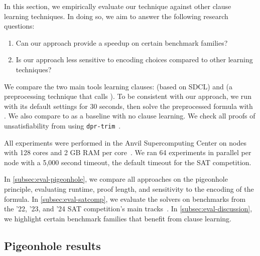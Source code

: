 In this section, we empirically evaluate our technique against other \pr clause
learning techniques. In doing so, we aim to answer the following research
questions:


\begin{enumerate}[label={RQ\arabic*}]
    \item Can our approach provide a speedup on certain benchmark families?
    \item Is our approach less sensitive to encoding choices compared to other
    \pr learning techniques?
\end{enumerate}


We compare the two main tools learning \pr clauses: \sadical (based on SDCL) and
\prelearn (a preprocessing technique that calls \sadical). To be consistent with
our approach, we run \prelearn with its default settings for 30 seconds, then
solve the preprocessed formula with \cadical. We also compare to \cadical as a
baseline with no \pr clause learning. We check all proofs of unsatisfiability
from \tool using \texttt{dpr-trim}~\cite{dpr-trim}.

All experiments were performed in the Anvil Supercomputing Center on nodes with
128 cores and 2 GB RAM per core~\cite{anvil}. We ran 64 experiments in parallel
per node with a 5,000 second timeout, the default timeout for the SAT
competition.

In \autoref{subsec:eval-pigeonhole}, we compare all approaches on the pigeonhole
principle, evaluating runtime, proof length, and sensitivity to the encoding of
the formula. In \autoref{subsec:eval-satcomp}, we evaluate the solvers on
benchmarks from the '22, '23, and '24 SAT competition's main
tracks~\cite{satcomp2022,satcomp2023,satcomp2024}. In
\autoref{subsec:eval-discussion}, we highlight certain benchmark families that
benefit from \pr clause learning.



\subsection{Pigeonhole results}~\label{subsec:eval-pigeonhole}


